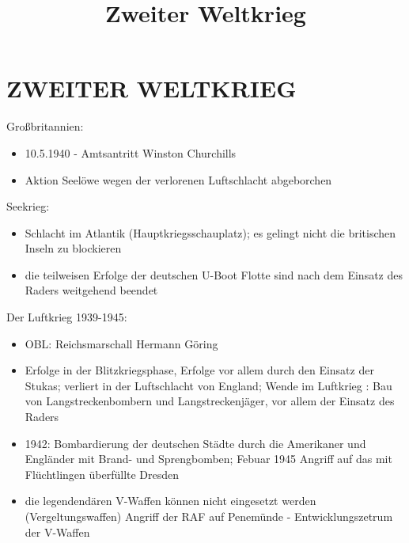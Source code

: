 \documentclass[a4paper,final]{report}
\title{Zweiter Weltkrieg}
\begin{document}
\chapter{ZWEITER WELTKRIEG}

Großbritannien:
	\begin{itemize}
	\item 10.5.1940 - Amtsantritt Winston Churchills
	\item Aktion Seelöwe wegen der verlorenen Luftschlacht abgeborchen
	\end{itemize}
	
Seekrieg:
	\begin{itemize}
	\item Schlacht im Atlantik (Hauptkriegsschauplatz); es gelingt nicht die britischen Inseln zu blockieren
	\item die teilweisen Erfolge der deutschen U-Boot Flotte sind nach dem Einsatz des Raders weitgehend beendet
	\end{itemize}
	
Der Luftkrieg 1939-1945:
	\begin{itemize}
	\item OBL: Reichsmarschall Hermann Göring
	\item Erfolge in der Blitzkriegsphase, Erfolge vor allem durch den Einsatz der Stukas; verliert in der Luftschlacht von England; Wende im Luftkrieg
	: Bau von Langstreckenbombern und Langstreckenjäger, vor allem der Einsatz des Raders
	\item 1942: Bombardierung der deutschen Städte durch die Amerikaner und Engländer mit Brand- und Sprengbomben; Febuar 1945 Angriff auf das mit
	Flüchtlingen überfüllte Dresden
	\item die legendendären V-Waffen können nicht eingesetzt werden (Vergeltungswaffen) Angriff der RAF auf Penemünde - Entwicklungszetrum der V-Waffen
	\end{itemize}
\end{document}
